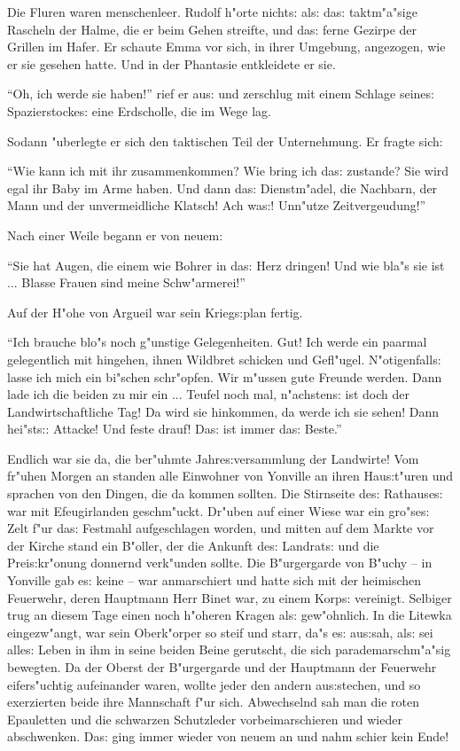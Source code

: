 \documentclass[oneside,12pt]{book}
\newcommand{\s}{s:}%
\begin{document}
Die Fluren waren menschenleer. Rudolf h"orte nicht{\s} al{\s}
da{\s} taktm"a"sige Rascheln der Halme, die er beim Gehen
streifte, und da{\s} ferne Gezirpe der Grillen im Hafer. Er
schaute Emma vor sich, in ihrer Umgebung, angezogen, wie er sie
gesehen hatte. Und in der Phantasie entkleidete er sie.

"`Oh, ich werde sie haben!"' rief er au{\s} und zerschlug mit
einem Schlage seine{\s} Spazierstocke{\s} eine Erdscholle, die im
Wege lag.

Sodann "uberlegte er sich den taktischen Teil der Unternehmung. Er
fragte sich:

"`Wie kann ich mit ihr zusammenkommen? Wie bring ich da{\s}
zustande? Sie wird egal ihr Baby im Arme haben. Und dann da{\s}
Dienstm"adel, die Nachbarn, der Mann und der unvermeidliche
Klatsch! Ach wa{\s}! Unn"utze Zeitvergeudung!"'

Nach einer Weile begann er von neuem:

"`Sie hat Augen, die einem wie Bohrer in da{\s} Herz dringen! Und
wie bla"s sie ist ... Blasse Frauen sind meine Schw"armerei!"'

Auf der H"ohe von Argueil war sein Krieg{\s}plan fertig.

"`Ich brauche blo"s noch g"unstige Gelegenheiten. Gut! Ich werde
ein paarmal gelegentlich mit hingehen, ihnen Wildbret schicken und
Gefl"ugel. N"otigenfall{\s} lasse ich mich ein bi"schen
schr"opfen. Wir m"ussen gute Freunde werden. Dann lade ich die
beiden zu mir ein ... Teufel noch mal, n"achsten{\s} ist doch der
Landwirtschaftliche Tag! Da wird sie hinkommen, da werde ich sie
sehen! Dann hei"st{\s}: Attacke! Und feste drauf! Da{\s} ist immer
da{\s} Beste."'


\newpage\begin{center}
{\large \so{A{ch}te{\s} Kapitel}}\bigskip\bigskip
\end{center}

Endlich war sie da, die ber"uhmte Jahre{\s}versammlung der
Landwirte! Vom fr"uhen Morgen an standen alle Einwohner von
Yonville an ihren Hau{\s}t"uren und sprachen von den Dingen, die
da kommen sollten. Die Stirnseite de{\s} Rathause{\s} war mit
Efeugirlanden geschm"uckt. Dr"uben auf einer Wiese war ein
gro"se{\s} Zelt f"ur da{\s} Festmahl aufgeschlagen worden, und
mitten auf dem Markte vor der Kirche stand ein B"oller, der die
Ankunft de{\s} Landrat{\s} und die Prei{\s}kr"onung donnernd
verk"unden sollte. Die B"urgergarde von B"uchy -- in Yonville gab
e{\s} keine -- war anmarschiert und hatte sich mit der heimischen
Feuerwehr, deren Hauptmann Herr Binet war, zu einem Korp{\s}
vereinigt. Selbiger trug an diesem Tage einen noch h"oheren Kragen
al{\s} gew"ohnlich. In die Litewka eingezw"angt, war sein
Oberk"orper so steif und starr, da"s e{\s} au{\s}sah, al{\s} sei
alle{\s} Leben in ihm in seine beiden Beine gerutscht, die sich
parademarschm"a"sig bewegten. Da der Oberst der B"urgergarde und
der Hauptmann der Feuerwehr eifers"uchtig aufeinander waren,
wollte jeder den andern au{\s}stechen, und so exerzierten beide
ihre Mannschaft f"ur sich. Abwechselnd sah man die roten
Epauletten und die schwarzen Schutzleder vorbeimarschieren und
wieder abschwenken. Da{\s} ging immer wieder von neuem an und nahm
schier kein Ende!
\end{document}
